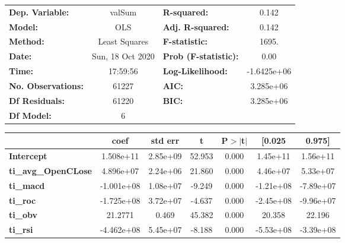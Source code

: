 \begin{center}
\begin{tabular}{lclc}
\toprule
\textbf{Dep. Variable:}     &      valSum      & \textbf{  R-squared:         } &      0.142   \\
\textbf{Model:}             &       OLS        & \textbf{  Adj. R-squared:    } &      0.142   \\
\textbf{Method:}            &  Least Squares   & \textbf{  F-statistic:       } &      1695.   \\
\textbf{Date:}              & Sun, 18 Oct 2020 & \textbf{  Prob (F-statistic):} &      0.00    \\
\textbf{Time:}              &     17:59:56     & \textbf{  Log-Likelihood:    } & -1.6425e+06  \\
\textbf{No. Observations:}  &       61227      & \textbf{  AIC:               } &  3.285e+06   \\
\textbf{Df Residuals:}      &       61220      & \textbf{  BIC:               } &  3.285e+06   \\
\textbf{Df Model:}          &           6      & \textbf{                     } &              \\
\bottomrule
\end{tabular}
\begin{tabular}{lcccccc}
                            & \textbf{coef} & \textbf{std err} & \textbf{t} & \textbf{P$> |$t$|$} & \textbf{[0.025} & \textbf{0.975]}  \\
\midrule
\textbf{Intercept}          &    1.508e+11  &     2.85e+09     &    52.953  &         0.000        &     1.45e+11    &     1.56e+11     \\
\textbf{ti\_avg\_OpenCLose} &    4.896e+07  &     2.24e+06     &    21.860  &         0.000        &     4.46e+07    &     5.33e+07     \\
\textbf{ti\_macd}           &   -1.001e+08  &     1.08e+07     &    -9.249  &         0.000        &    -1.21e+08    &    -7.89e+07     \\
\textbf{ti\_roc}            &   -1.725e+08  &     3.72e+07     &    -4.637  &         0.000        &    -2.45e+08    &    -9.96e+07     \\
\textbf{ti\_obv}            &      21.2771  &        0.469     &    45.382  &         0.000        &       20.358    &       22.196     \\
\textbf{ti\_rsi}            &   -4.462e+08  &     5.45e+07     &    -8.188  &         0.000        &    -5.53e+08    &    -3.39e+08     \\

\end{tabular}
\end{center}
